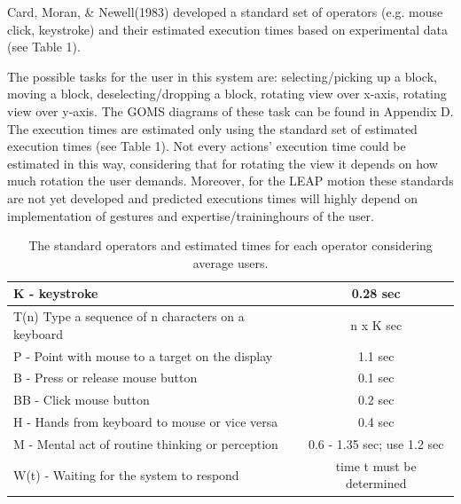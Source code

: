 Card, Moran, \& Newell(1983) developed a standard set of operators (e.g. mouse click, keystroke) and their estimated execution times based on experimental data (see Table 1). 

The possible tasks for the user in this system are: selecting/picking up a block, moving a block, deselecting/dropping a block, rotating view over x-axis, rotating view over y-axis. The GOMS diagrams of these task can be found in Appendix D. The execution times are estimated only using the standard set of estimated execution times (see Table 1). Not every actions' execution time could be estimated in this way, considering that for rotating the view it depends on how much rotation the user demands. Moreover, for the LEAP motion these standards are not yet developed and predicted executions times will highly depend on implementation of gestures and expertise/traininghours of the user.


\begin{table} [H]
\centering
\begin{tabular}{|l|c|}
\hline
K - keystroke & 0.28 sec\\ \hline
T(n) Type a sequence of n characters on a keyboard & n x K sec \\ \hline
P - Point with mouse to a target on the display & 1.1 sec \\ \hline
B - Press or release mouse button & 0.1 sec \\ \hline
BB - Click mouse button & 0.2 sec \\ \hline
H - Hands from keyboard to mouse or vice versa & 0.4 sec \\  \hline
M - Mental act of routine thinking or perception & 0.6 - 1.35 sec; use 1.2 sec \\ \hline
W(t) - Waiting for the system to respond & time t must be determined \\ 
\hline
\end{tabular}
\caption{\label{tab:StandardOperators} The standard operators and estimated times for each operator considering average users.}
\end{table}

